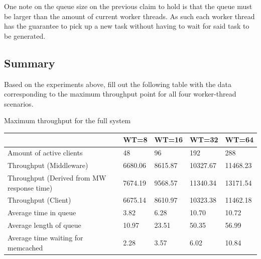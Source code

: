             One note on the queue size on the previous claim to hold is that the queue must be larger than the amount of
            current worker threads. As such each worker thread has the guarantee to pick up a new task without having
            to wait for said task to be generated.

    \subsection{Summary\label{subsec:4_summary}}

        Based on the experiments above, fill out the following table with the data corresponding to the maximum throughput point for all four worker-thread scenarios.

        \begin{center}
            {Maximum throughput for the full system}
            \begin{tabular}{|l|p{1.5cm}|p{1.5cm}|p{1.5cm}|p{1.5cm}|}
                \hline                                            & WT=8    & WT=16   & WT=32    & WT=64    \\
                \hline Amount of active clients                   & 48      & 96      & 192      & 288      \\
                \hline Throughput (Middleware)                    & 6680.06 & 8615.87 & 10327.67 & 11468.23 \\
                \hline Throughput (Derived from MW response time) & 7674.19 & 9568.57 & 11340.34 & 13171.54 \\
                \hline Throughput (Client)                        & 6675.14 & 8610.97 & 10323.38 & 11462.18 \\
                \hline Average time in queue                      & 3.82    & 6.28    & 10.70    & 10.72    \\
                \hline Average length of queue                    & 10.97   & 23.51   & 50.35    & 56.99    \\
                \hline Average time waiting for memcached         & 2.28    & 3.57    & 6.02     & 10.84    \\
                \hline 
            \end{tabular}
        \end{center}

